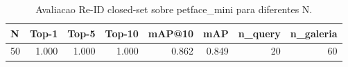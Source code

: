 \begin{table}[!htb]
\centering
\caption{Avaliacao Re-ID closed-set sobre petface\_mini para diferentes N.}
\label{tab:reid-resumo-petface_mini}
\begin{tabular}{lrrrrrrr}
\toprule
N & Top-1 & Top-5 & Top-10 & mAP@10 & mAP & n\_query & n\_galeria \\
\midrule
50 & 1.000 & 1.000 & 1.000 & 0.862 & 0.849 & 20 & 60 \\
\bottomrule
\end{tabular}
\end{table}
